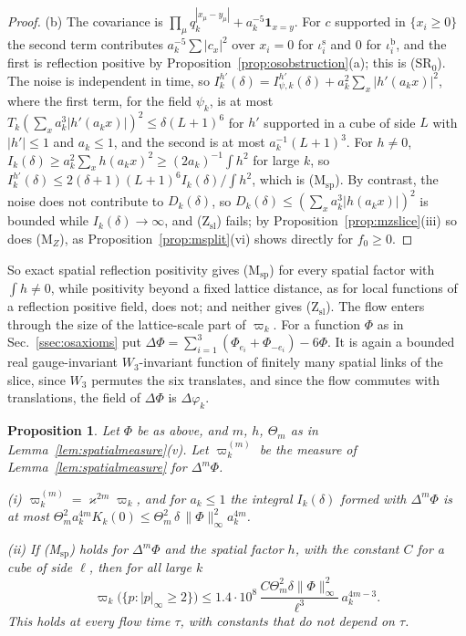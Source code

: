 \documentclass[aps,prd,twocolumn,superscriptaddress,nofootinbib,longbibliography,floatfix,amsmath,amssymb,10pt]{revtex4-2}
\newtheorem{proposition}[theorem]{Proposition}
\theoremstyle{definition}
\theoremstyle{remark}
\begin{document}
\begin{proof}
(b) The covariance is $\prod_\mu q_k^{|x_\mu-y_\mu|}+a_k^{-5}\mathbf
1_{x=y}$. For $c$ supported in $\{x_i\ge0\}$ the second term contributes
$a_k^{-5}\sum|c_x|^2$ over $x_i=0$ for $\iota^{\mathrm s}_i$ and $0$
for $\iota^{\mathrm b}_i$, and the first is reflection positive by
Proposition~\ref{prop:osobstruction}(a); this is (SR$_0$). The noise is
independent in time, so $I^{h'}_k(\delta)=I^{h'}_{\psi,k}(\delta)+a_k^2
\sum_x|h'(a_kx)|^2$, where the first term, for the field $\psi_k$, is at
most $T_k(\sum_xa_k^3|h'(a_kx)|)^2\le\delta(L+1)^6$ for $h'$ supported in a
cube of side $L$ with $|h'|\le1$ and $a_k\le1$, and the second is at most
$a_k^{-1}(L+1)^3$. For $h\ne0$, $I_k(\delta)\ge a_k^2\sum_xh(a_kx)^2\ge
(2a_k)^{-1}\int h^2$ for large $k$, so $I^{h'}_k(\delta)\le2(\delta+1)
(L+1)^6I_k(\delta)/\int h^2$, which is (M$_{\mathrm{sp}}$). By
contrast, the noise does not contribute to $D_k(\delta)$, so $D_k(\delta)\le(\sum_xa_k^3|h(a_kx)|)^2$ is bounded while $I_k(\delta)\to\infty$, and (Z$_{\mathrm{sl}}$) fails; by Proposition~\ref{prop:mzslice}(iii) so does (M$_Z$),
as Proposition~\ref{prop:msplit}(vi) shows directly for $f_0\ge0$.
\end{proof}

So exact spatial reflection positivity gives (M$_{\mathrm{sp}}$) for every
spatial factor with $\int h\ne0$, while positivity beyond a fixed lattice
distance, as for local functions of a reflection positive field, does not;
and neither gives (Z$_{\mathrm{sl}}$). The flow enters through the size of
the lattice-scale part of $\varpi_k$. For a function $\Phi$ as in Sec.~\ref{ssec:osaxioms} put
$\Delta\Phi=\sum_{i=1}^3(\Phi_{e_i}+\Phi_{-e_i})-6\Phi$. It is again a
bounded real gauge-invariant $W_3$-invariant function of finitely many
spatial links of the slice, since $W_3$ permutes the six translates, and
since the flow commutes with translations, the field of $\Delta\Phi$ is
$\Delta\varphi_k$.

\begin{proposition}\label{prop:laplaceladder}
Let $\Phi$ be as above, and $m$, $h$, $\Theta_m$ as in
Lemma~\textup{\ref{lem:spatialmeasure}(v)}. Let
$\varpi^{(m)}_k$ be the measure of Lemma~\textup{\ref{lem:spatialmeasure}}
for $\Delta^m\Phi$.

\textup{(i)} $\varpi^{(m)}_k=\varkappa^{2m}\varpi_k$, and for $a_k\le1$ the
integral $I_k(\delta)$ formed with $\Delta^m\Phi$ is at most $\Theta_m^2
a_k^{4m}K_k(0)\le\Theta_m^2\,\delta\,\|\Phi\|_\infty^2a_k^{4m}$.

\textup{(ii)} If \textup{(M$_{\mathrm{sp}}$)} holds for $\Delta^m\Phi$ and
the spatial factor $h$, with the constant $C$ for a cube of side $\ell$,
then for all large $k$
\[
\varpi_k\bigl(\{p:|p|_\infty\ge2\}\bigr)\le1.4\cdot10^8\,\frac{C\Theta_m^2
\delta\|\Phi\|_\infty^2}{\ell^3}\,a_k^{4m-3} .
\]
This holds at every flow time $\tau$, with constants that do not depend on
$\tau$.
\end{proposition}
\end{document}
